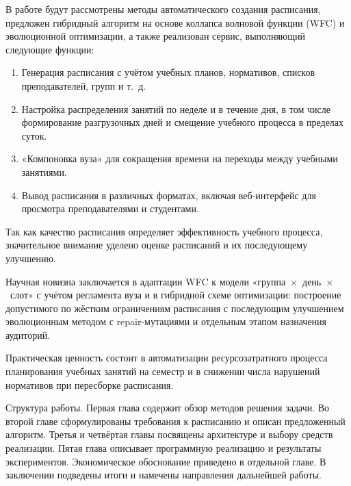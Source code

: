 В работе будут рассмотрены методы автоматического создания расписания, предложен гибридный алгоритм на основе коллапса волновой функции (WFC) и эволюционной оптимизации, а также реализован сервис, выполняющий следующие функции:
\begin{enumerate}
	\item Генерация расписания с учётом учебных планов, нормативов, списков преподавателей, групп и т.~д.
	\item Настройка распределения занятий по неделе и в течение дня, в том числе формирование разгрузочных дней и смещение учебного процесса в пределах суток.
	\item «Компоновка вуза» для сокращения времени на переходы между учебными занятиями.
	\item Вывод расписания в различных форматах, включая веб-интерфейс для просмотра преподавателями и студентами.
\end{enumerate}

Так как качество расписания определяет эффективность учебного процесса, значительное внимание уделено оценке расписаний и их последующему улучшению.

Научная новизна заключается в адаптации WFC к модели «группа~$\times$~день~$\times$~слот» с учётом регламента вуза и в гибридной схеме оптимизации: построение допустимого по жёстким ограничениям расписания с последующим улучшением эволюционным методом с repair-мутациями и отдельным этапом назначения аудиторий.

Практическая ценность состоит в автоматизации ресурсозатратного процесса планирования учебных занятий на семестр и в снижении числа нарушений нормативов при пересборке расписания.

Структура работы. Первая глава содержит обзор методов решения задачи. Во второй главе сформулированы требования к расписанию и описан предложенный алгоритм. Третья и четвёртая главы посвящены архитектуре и выбору средств реализации. Пятая глава описывает программную реализацию и результаты экспериментов. Экономическое обоснование приведено в отдельной главе. В заключении подведены итоги и намечены направления дальнейшей работы.

